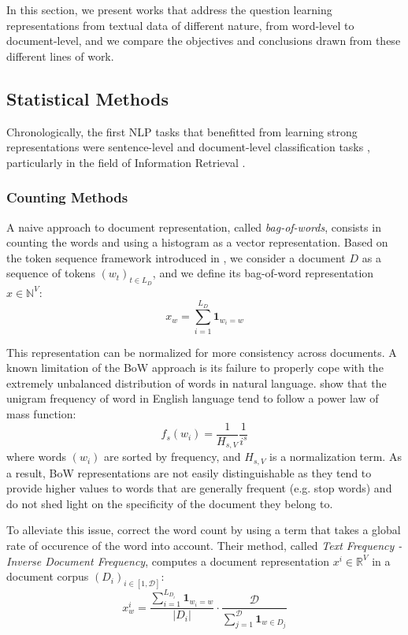 In this section, we present works that address the question learning representations from textual data of different nature, from word-level to document-level, and we compare the objectives and conclusions drawn from these different lines of work.




\subsection{Statistical Methods}

Chronologically, the first NLP tasks that benefitted from learning  strong representations were sentence-level and document-level classification tasks \citep{baharudin2010review}, particularly in the field of Information Retrieval \citep{chowdhury2010introduction}. 

\subsubsection{Counting Methods}

A naive approach to document representation, called \textit{bag-of-words}, consists in counting the words and using a histogram as a vector representation. Based on the token sequence framework introduced in , we consider a document $D$ as a sequence of tokens $(w_t)_{t \in {L_D}}$, and we define its bag-of-word representation $x \in \mathbb{N}^V$:
$$
x_w = \sum_{i=1}^{L_D} \mathbf{1}_{w_i = w}
$$

This representation can be normalized for more consistency across documents. A known limitation of the BoW approach is its failure to properly cope with the extremely unbalanced distribution of words in natural language. \citet{zipf_psycho-biology_1935} show that the unigram frequency of word in English language tend to follow a power law of mass function:
$$
f_s(w_i) = \frac{1}{H_{s, V}} \frac{1}{i^s}
$$
where words $(w_i)$ are sorted by frequency, and $H_{s, V}$ is a normalization term. As a result, BoW representations are not easily distinguishable as they tend to provide higher values to words that are generally frequent (e.g. stop words) and do not shed light on the specificity of the document they belong to.

To alleviate this issue, \citet{tf_idf} correct the word count by using a term that takes a global rate of occurence of the word into account. Their method, called \textit{Text Frequency - Inverse Document Frequency}, computes a document representation $x^i \in \mathbb{R}^V$ in a document corpus $(D_i)_{i \in [1, \mathcal{D}]}$:
$$
x^i_w = \frac{\sum_{i=1}^{L_{D_i}} \mathbf{1}_{w_i = w}}{|D_i|} \cdot \frac{\mathcal{D}}{\sum_{j=1}^{\mathcal{D}} \mathbf{1}_{w \in D_j}}
$$

